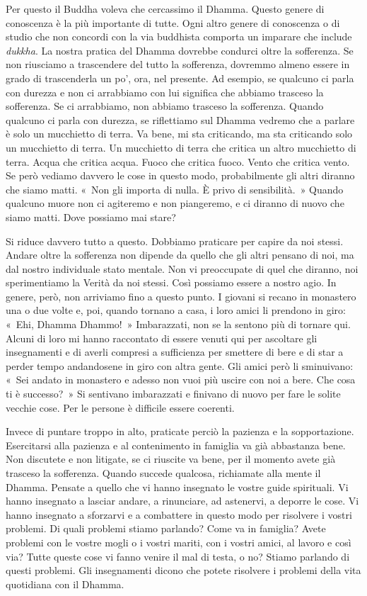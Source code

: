 Per questo il Buddha voleva che cercassimo il Dhamma. Questo genere di
conoscenza è la più importante di tutte. Ogni altro genere di conoscenza
o di studio che non concordi con la via buddhista comporta un imparare
che include \emph{dukkha}. La nostra pratica del Dhamma dovrebbe
condurci oltre la sofferenza. Se non riusciamo a trascendere del tutto
la sofferenza, dovremmo almeno essere in grado di trascenderla un po',
ora, nel presente. Ad esempio, se qualcuno ci parla con durezza e non ci
arrabbiamo con lui significa che abbiamo trasceso la sofferenza. Se ci
arrabbiamo, non abbiamo trasceso la sofferenza. Quando qualcuno ci parla
con durezza, se riflettiamo sul Dhamma vedremo che a parlare è solo un
mucchietto di terra. Va bene, mi sta criticando, ma sta criticando solo
un mucchietto di terra. Un mucchietto di terra che critica un altro
mucchietto di terra. Acqua che critica acqua. Fuoco che critica fuoco.
Vento che critica vento. Se però vediamo davvero le cose in questo modo,
probabilmente gli altri diranno che siamo matti. «~Non gli importa di
nulla. È privo di sensibilità.~» Quando qualcuno muore non ci agiteremo
e non piangeremo, e ci diranno di nuovo che siamo matti. Dove possiamo
mai stare?

Si riduce davvero tutto a questo. Dobbiamo praticare per capire da noi
stessi. Andare oltre la sofferenza non dipende da quello che gli altri
pensano di noi, ma dal nostro individuale stato mentale. Non vi
preoccupate di quel che diranno, noi sperimentiamo la Verità da noi
stessi. Così possiamo essere a nostro agio. In genere, però, non
arriviamo fino a questo punto. I giovani si recano in monastero una o
due volte e, poi, quando tornano a casa, i loro amici li prendono in
giro: «~Ehi, Dhamma Dhammo!~» Imbarazzati, non se la sentono più di
tornare qui. Alcuni di loro mi hanno raccontato di essere venuti qui per
ascoltare gli insegnamenti e di averli compresi a sufficienza per
smettere di bere e di star a perder tempo andandosene in giro con altra
gente. Gli amici però li sminuivano: «~Sei andato in monastero e adesso
non vuoi più uscire con noi a bere. Che cosa ti è successo?~» Si
sentivano imbarazzati e finivano di nuovo per fare le solite vecchie
cose. Per le persone è difficile essere coerenti.

Invece di puntare troppo in alto, praticate perciò la pazienza e la
sopportazione. Esercitarsi alla pazienza e al contenimento in famiglia
va già abbastanza bene. Non discutete e non litigate, se ci riuscite va
bene, per il momento avete già trasceso la sofferenza. Quando succede
qualcosa, richiamate alla mente il Dhamma. Pensate a quello che vi hanno
insegnato le vostre guide spirituali. Vi hanno insegnato a lasciar
andare, a rinunciare, ad astenervi, a deporre le cose. Vi hanno
insegnato a sforzarvi e a combattere in questo modo per risolvere i
vostri problemi. Di quali problemi stiamo parlando? Come va in famiglia?
Avete problemi con le vostre mogli o i vostri mariti, con i vostri
amici, al lavoro e così via? Tutte queste cose vi fanno venire il mal di
testa, o no? Stiamo parlando di questi problemi. Gli insegnamenti dicono
che potete risolvere i problemi della vita quotidiana con il Dhamma.


